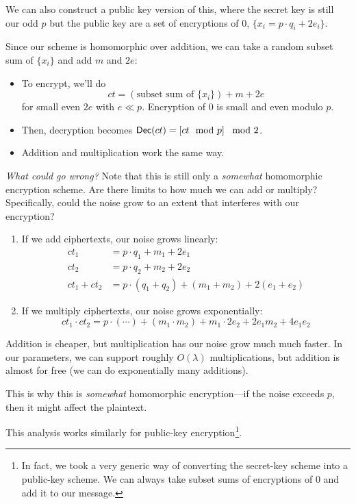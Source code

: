 We can also construct a public key version of this, where the secret key is still our odd $p$ but the public key are a set of encryptions of $0$, $\{x_i = p\cdot q_i + 2e_i\}$.

Since our scheme is homomorphic over addition, we can take a random subset sum of $\{x_i\}$ and add $m$ and $2e$:
\begin{itemize}
    \item To encrypt, we'll do
          \[ct = (\text{subset sum of $\{x_i\}$}) + m + 2e\]
          for small even $2e$ with $e \ll p$. Encryption of $0$ is small and even modulo $p$.
    \item Then, decryption becomes $\operatorname{\mathsf{Dec}}(ct) = \left[ ct\mod p \right]\mod 2$.
    \item Addition and multiplication work the same way.
\end{itemize}

\emph{What could go wrong?} Note that this is still only a \emph{somewhat} homomorphic encryption scheme. Are there limits to how much we can add or multiply? Specifically, could the noise grow to an extent that interferes with our encryption?
\begin{enumerate}
    \item If we add ciphertexts, our noise grows linearly:
          \begin{align*}
              ct_1        & = p\cdot q_1 + m_1 + 2e_1                         \\
              ct_2        & = p\cdot q_2 + m_2 + 2e_2                         \\
              ct_1 + ct_2 & = p\cdot (q_1 + q_2) + (m_1 + m_2) + 2(e_1 + e_2)
          \end{align*}
    \item If we multiply ciphertexts, our noise grows exponentially:
          \[ct_1 \cdot ct_2 = p\cdot (\cdots) + (m_1 \cdot m_2) + m_1\cdot 2e_2 + 2e_1m_2 + 4e_1e_2\]
\end{enumerate}
Addition is cheaper, but multiplication has our noise grow much much faster. In our parameters, we can support roughly $O(\lambda)$ multiplications, but addition is almost for free (we can do exponentially many additions).

This is why this is \emph{somewhat} homomorphic encryption---if the noise exceeds $p$, then it might affect the plaintext.

This analysis works similarly for public-key encryption\footnote{In fact, we took a very generic way of converting the secret-key scheme into a public-key scheme. We can always take subset sums of encryptions of $0$ and add it to our message.}.

